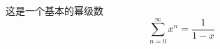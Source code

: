 \documentclass{article}
\begin{document}
\begin{CJK*}{UTF8}{gbsn}

这是一个基本的幂级数
\[ \sum_{n = 0}^{\infty} x^n = \frac{1}{1 - x} \]

\end{CJK*}
\end{document}

